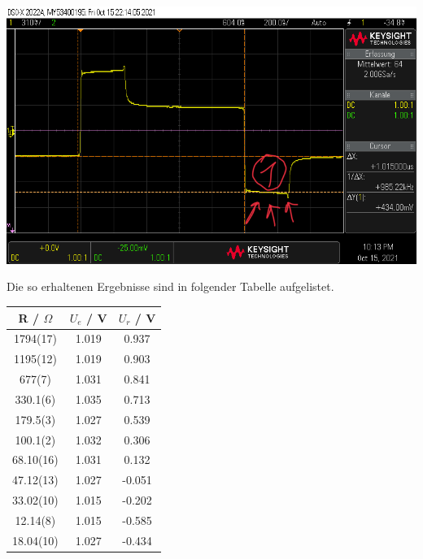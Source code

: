 \documentclass[11pt,ngerman]{scrartcl}
\begin{document}
\begin{center}
	\begin{minipage}[t]{0.7\textwidth}
		\includegraphics[width=\textwidth]{oszi/scope_0_26}
		\label{fig:wid}
	\end{minipage}
\end{center}

\noindent Die so erhaltenen Ergebnisse sind in folgender Tabelle aufgelistet.

\begin{table}[H]
	\begin{center}
		\begin{tabular}{|S|c|c|} \hline
			{R / $\Omega$} & { $U_{e}$ / V} & {$U_r$ / V} \\ \hline

			1794(17)       & 1.019          & 0.937       \\
			1195(12)       & 1.019          & 0.903       \\
			677(7)         & 1.031          & 0.841       \\
			330.1(6)       & 1.035          & 0.713       \\
			179.5(3)       & 1.027          & 0.539       \\
			100.1(2)       & 1.032          & 0.306       \\
			68.10(16)      & 1.031          & 0.132       \\
			47.12(13)      & 1.027          & -0.051      \\
			33.02(10)      & 1.015          & -0.202      \\
			12.14(8)       & 1.015          & -0.585      \\
			18.04(10)      & 1.027          & -0.434      \\
			\hline
		\end{tabular}
	\end{center}
	\label{rwerte}
\end{table}
\end{document}
